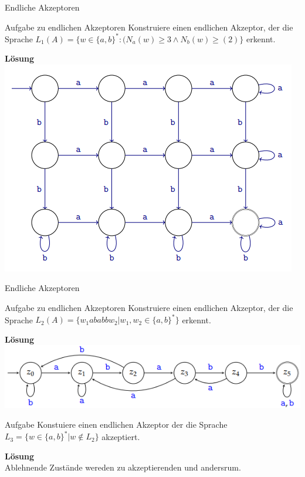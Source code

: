 \begin{frame}{Endliche Akzeptoren}
	\begin{taskblock}{Aufgabe zu endlichen Akzeptoren}
		Konstruiere einen endlichen Akzeptor, der die Sprache $L_1(A) = \{w \in \{a,b\}^* : (N_a(w) \geq 3 \land N_b(w) \geq(2)\}$ erkennt.
	\end{taskblock}
	
	\pause
	\textbf{Lösung}\\
	\includegraphics[scale=0.6]{images/AufgAkzeptor2.png}
\end{frame}
		
		

\begin{frame}{Endliche Akzeptoren}
	\begin{taskblock}{Aufgabe zu endlichen Akzeptoren}
		Konstruiere einen endlichen Akzeptor, der die Sprache $L_2(A) = \{w_1 ababb w_2| w_1, w_2 \in \{a,b\}^*\}$ erkennt.
	\end{taskblock}
	
	\pause
	\textbf{Lösung}\\
	\includegraphics[scale=0.7]{images/AufgAkzeptor.png}\\
	\pause
	\begin{taskblock}{Aufgabe}
		Konstuiere einen endlichen Akzeptor der die Sprache $L_3 =\{w \in \{a,b\}^*| w \not \in L_2\}$ akzeptiert.
	\end{taskblock}
	\pause
	\textbf{Lösung} \\Ablehnende Zustände wereden zu akzeptierenden und andersrum.
\end{frame}		 

